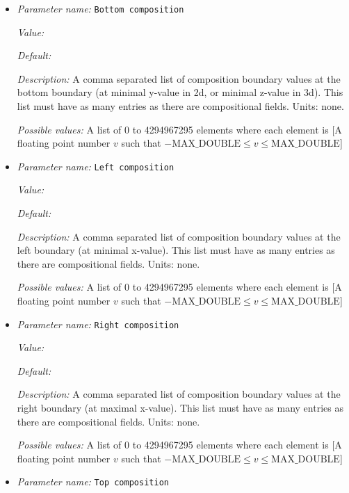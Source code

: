 \begin{itemize}
\item {\it Parameter name:} {\tt Bottom composition}
\label{parameters:Boundary composition model/Box/Bottom composition}


{\it Value:} 


{\it Default:} 


{\it Description:} A comma separated list of composition boundary values at the bottom boundary (at minimal y-value in 2d, or minimal z-value in 3d). This list must have as many entries as there are compositional fields. Units: none.


{\it Possible values:} A list of 0 to 4294967295 elements where each element is [A floating point number $v$ such that $-\text{MAX\_DOUBLE} \leq v \leq \text{MAX\_DOUBLE}$]
\item {\it Parameter name:} {\tt Left composition}
\label{parameters:Boundary composition model/Box/Left composition}


{\it Value:} 


{\it Default:} 


{\it Description:} A comma separated list of composition boundary values at the left boundary (at minimal x-value). This list must have as many entries as there are compositional fields. Units: none.


{\it Possible values:} A list of 0 to 4294967295 elements where each element is [A floating point number $v$ such that $-\text{MAX\_DOUBLE} \leq v \leq \text{MAX\_DOUBLE}$]
\item {\it Parameter name:} {\tt Right composition}
\label{parameters:Boundary composition model/Box/Right composition}


{\it Value:} 


{\it Default:} 


{\it Description:} A comma separated list of composition boundary values at the right boundary (at maximal x-value). This list must have as many entries as there are compositional fields. Units: none.


{\it Possible values:} A list of 0 to 4294967295 elements where each element is [A floating point number $v$ such that $-\text{MAX\_DOUBLE} \leq v \leq \text{MAX\_DOUBLE}$]
\item {\it Parameter name:} {\tt Top composition}
\label{parameters:Boundary composition model/Box/Top composition}



\end{itemize}
